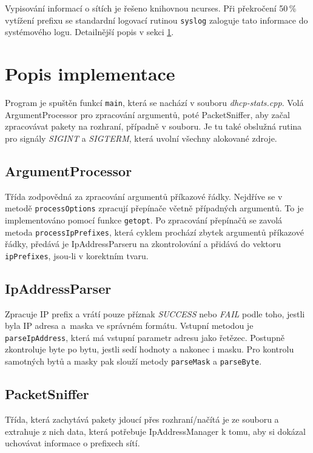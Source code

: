 \documentclass[a4paper, 11pt, hidelinks]{article}
\begin{document}
Vypisování informací o sítích je řešeno knihovnou ncurses. 
Při překročení 50\,\% vytížení prefixu se standardní logovací rutinou \texttt{syslog} zaloguje tato informace do systémového logu.
Detailnější popis v sekci \ref{3_popis}.

\section{Popis implementace}\label{3_popis}
Program je spuštěn funkcí \texttt{main}, která se nachází v souboru \emph{dhcp-stats.cpp}. 
Volá ArgumentProcessor pro zpracování argumentů, poté PacketSniffer, aby začal zpracovávat pakety na rozhraní, případně v souboru.
Je tu také obslužná rutina pro signály \emph{SIGINT} a \emph{SIGTERM}, která uvolní všechny alokované zdroje.

\subsection{ArgumentProcessor}\label{3_1_ap}
Třída zodpovědná za zpracování argumentů příkazové řádky.
Nejdříve se v metodě \texttt{processOptions} zpracují přepínače včetně případných argumentů.
To je implementováno pomocí funkce \texttt{getopt}.
Po zpracování přepínačů se zavolá metoda \texttt{processIpPrefixes}, která cyklem prochází zbytek argumentů příkazové řádky, předává je IpAddressParseru na zkontrolování a přidává do vektoru \texttt{ipPrefixes}, jsou-li v korektním tvaru.

\subsection{IpAddressParser}\label{3_2_ipap}
Zpracuje IP prefix a vrátí pouze příznak \emph{SUCCESS} nebo \emph{FAIL} podle toho, jestli byla IP adresa a~maska ve správném formátu.
Vstupní metodou je \texttt{parseIpAddress}, která má vstupní parametr adresu jako řetězec. Postupně zkontroluje byte po bytu, jestli sedí hodnoty a nakonec i masku. 
Pro kontrolu samotných bytů a masky pak slouží metody \texttt{parseMask} a \texttt{parseByte}.

\subsection{PacketSniffer}\label{3_3_ps}
Třída, která zachytává pakety jdoucí přes rozhraní/načítá je ze souboru a extrahuje z nich data, která potřebuje IpAddressManager k tomu, aby si dokázal uchovávat informace o prefixech sítí.
\end{document}
